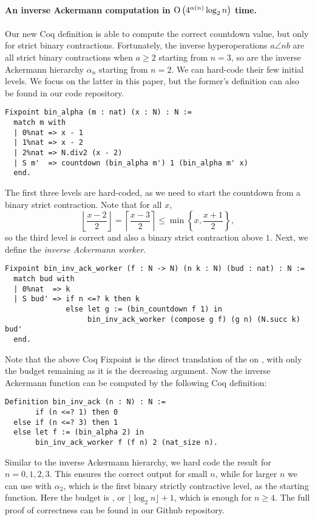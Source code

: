 \paragraph*{An inverse Ackermann computation in $\text{O}\left(4^{\alpha(n)}\log_2 n\right)$ time.}
Our new Coq definition is able to compute the correct countdown value, but only for strict binary contractions. Fortunately, the inverse hyperoperations $a\angle{n}b$ are all strict binary contractions when $a\ge 2$ starting from $n = 3$, so are the inverse Ackermann hierarchy $\alpha_n$ starting from $n = 2$. We can hard-code their few initial levels. We focus on the latter in this paper, but the former's definition can also be found in our code repository.
\begin{lstlisting}
Fixpoint bin_alpha (m : nat) (x : N) : N :=
  match m with
  | 0%nat => x - 1
  | 1%nat => x - 2
  | 2%nat => N.div2 (x - 2)
  | S m'  => countdown (bin_alpha m') 1 (bin_alpha m' x)
  end.
\end{lstlisting}
The first three levels are hard-coded, as we need to start the countdown from a binary strict contraction. Note that for all $x$,
\begin{equation*}
\left\lfloor \frac{x - 2}{2} \right\rfloor = \left\lceil \frac{x - 3}{2} \right\rceil \le \min\left\{x, \frac{x + 1}{2}\right\},
\end{equation*}
so the third level is correct and also a binary strict contraction above $1$. Next, we define the \emph{inverse Ackermann worker}.
\begin{lstlisting}
Fixpoint bin_inv_ack_worker (f : N -> N) (n k : N) (bud : nat) : N :=
  match bud with
  | 0%nat  => k
  | S bud' => if n <=? k then k
              else let g := (bin_countdown f 1) in
                   bin_inv_ack_worker (compose g f) (g n) (N.succ k) bud'
  end.
\end{lstlisting}
Note that the above Coq Fixpoint is the direct translation of the  on , with only the budget remaining  as it is the decreasing argument. Now the inverse Ackermann function can be computed by the following Coq definition:
\begin{lstlisting}
Definition bin_inv_ack (n : N) : N :=
       if (n <=? 1) then 0
  else if (n <=? 3) then 1
  else let f := (bin_alpha 2) in
       bin_inv_ack_worker f (f n) 2 (nat_size n).
\end{lstlisting}
Similar to the inverse Ackermann hierarchy, we hard code the result for $n = 0,1,2,3$. This ensures the correct output for small $n$, while for larger $n$ we can use  with $\alpha_2$, which is the first binary strictly contractive level, as the starting function. Here the budget is , or $\lfloor \log_2n \rfloor + 1$, which is enough for $n\ge 4$. The full proof of correctness can be found in our Github repository.

